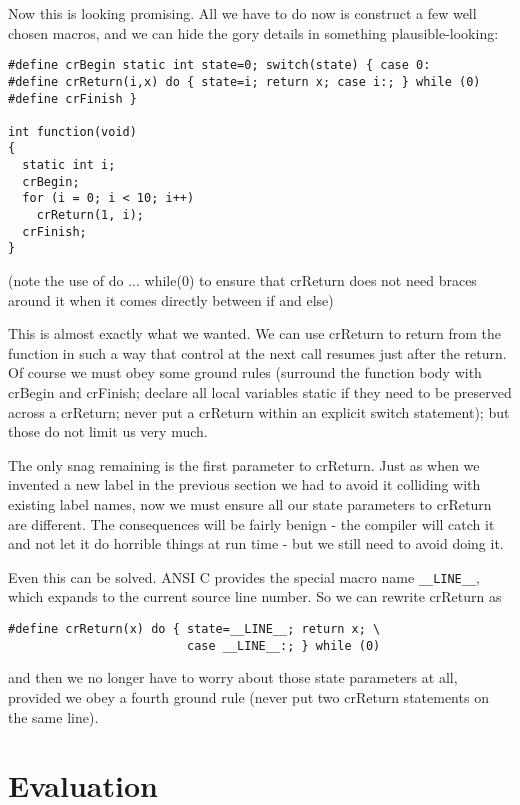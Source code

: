\documentclass[12pt]{article}
\begin{document}
\begin{CJK}{UTF8}{bsmi}
Now this is looking promising. All we have to do now is construct a few well chosen macros, and we can hide the gory details in something plausible-looking:

\begin{lstlisting}[basicstyle=\footnotesize, breaklines=true]
#define crBegin static int state=0; switch(state) { case 0:
#define crReturn(i,x) do { state=i; return x; case i:; } while (0)
#define crFinish }

int function(void) 
{
  static int i;
  crBegin;
  for (i = 0; i < 10; i++)
    crReturn(1, i);
  crFinish;
}
\end{lstlisting}

(note the use of do ... while(0) to ensure that crReturn does not need braces around it when it comes directly between if and else)

This is almost exactly what we wanted. We can use crReturn to return from the function in such a way that control at the next call resumes just after the return. Of course we must obey some ground rules (surround the function body with crBegin and crFinish; declare all local variables static if they need to be preserved across a crReturn; never put a crReturn within an explicit switch statement); but those do not limit us very much.

The only snag remaining is the first parameter to crReturn. Just as when we invented a new label in the previous section we had to avoid it colliding with existing label names, now we must ensure all our state parameters to crReturn are different. The consequences will be fairly benign - the compiler will catch it and not let it do horrible things at run time - but we still need to avoid doing it.

Even this can be solved. ANSI C provides the special macro name \verb+__LINE__+, which expands to the current source line number. So we can rewrite crReturn as

\begin{lstlisting}[basicstyle=\footnotesize, breaklines=true]
#define crReturn(x) do { state=__LINE__; return x; \
                         case __LINE__:; } while (0)
\end{lstlisting}

and then we no longer have to worry about those state parameters at all, provided we obey a fourth ground rule (never put two crReturn statements on the same line).

\section{Evaluation}


\end{CJK}
\end{document}
